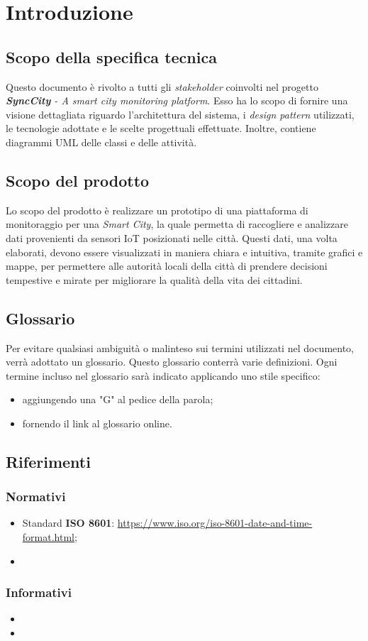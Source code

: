 \section{Introduzione}
\setcounter{subsection}{0}
\subsection{Scopo della specifica tecnica}
Questo documento è rivolto a tutti gli \textit{stakeholder} coinvolti nel progetto \textit{\textbf{SyncCity} - A smart city monitoring platform}.
Esso ha lo scopo di fornire una visione dettagliata riguardo l'architettura del sistema, i \textit{design pattern} utilizzati, le tecnologie adottate e le scelte progettuali effettuate.
Inoltre, contiene diagrammi UML delle classi e delle attività.

\subsection{Scopo del prodotto}
Lo scopo del prodotto è realizzare un prototipo di una piattaforma di monitoraggio per una \textit{Smart City}, la quale permetta di raccogliere e analizzare dati provenienti da sensori IoT posizionati nelle città.
Questi dati, una volta elaborati, devono essere visualizzati in maniera chiara e intuitiva, tramite grafici e mappe, per permettere alle autorità locali della città di prendere decisioni
tempestive e mirate per migliorare la qualità della vita dei cittadini.

\subsection{Glossario}
Per evitare qualsiasi ambiguità o malinteso sui termini utilizzati nel documento, verrà adottato un glossario. Questo glossario conterrà varie definizioni. Ogni termine incluso nel glossario sarà indicato applicando uno stile specifico:
\begin{itemize}
	\item aggiungendo una "G" al pedice della parola;
	\item fornendo il link al glossario online.
\end{itemize}

\subsection{Riferimenti}
\subsubsection{Normativi} %
\begin{itemize}
	\item Standard \textbf{ISO 8601}: \url{https://www.iso.org/iso-8601-date-and-time-format.html};
	\item
\end{itemize}
\subsubsection{Informativi}
\begin{itemize} %
	\item
	\item
\end{itemize}
